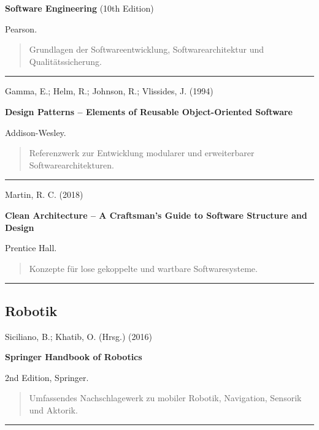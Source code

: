 \documentclass[
  a4paper,
  12pt,
  DIV=12,        %
  parskip=half,  %
  headings=small %
]{scrartcl}
\theoremstyle{definition}
\theoremstyle{definition}
\begin{document}
\textbf{Software Engineering} (10th Edition)

Pearson.

\begin{quote}
Grundlagen der Softwareentwicklung, Softwarearchitektur und
Qualitätssicherung.
\end{quote}

\begin{center}\rule{0.5\linewidth}{0.5pt}\end{center}

Gamma, E.; Helm, R.; Johnson, R.; Vlissides, J. (1994)

\textbf{Design Patterns -- Elements of Reusable Object-Oriented
Software}

Addison-Wesley.

\begin{quote}
Referenzwerk zur Entwicklung modularer und erweiterbarer
Softwarearchitekturen.
\end{quote}

\begin{center}\rule{0.5\linewidth}{0.5pt}\end{center}

Martin, R. C. (2018)

\textbf{Clean Architecture -- A Craftsman's Guide to Software Structure
and Design}

Prentice Hall.

\begin{quote}
Konzepte für lose gekoppelte und wartbare Softwaresysteme.
\end{quote}

\begin{center}\rule{0.5\linewidth}{0.5pt}\end{center}

\subsection{Robotik}\label{robotik}

Siciliano, B.; Khatib, O. (Hrsg.) (2016)

\textbf{Springer Handbook of Robotics}

2nd Edition, Springer.

\begin{quote}
Umfassendes Nachschlagewerk zu mobiler Robotik, Navigation, Sensorik und
Aktorik.
\end{quote}

\begin{center}\rule{0.5\linewidth}{0.5pt}\end{center}
\end{document}
